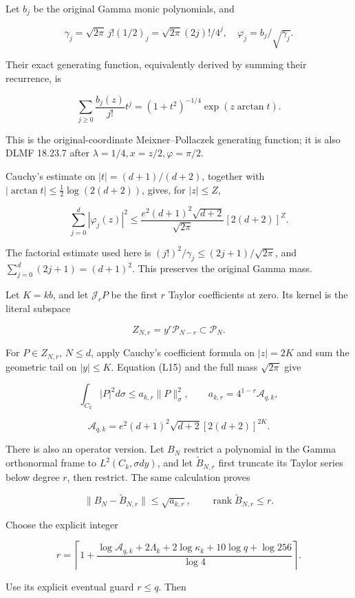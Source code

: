 \documentclass[11pt,a4paper]{article}
\begin{document}
Let \(b_j\) be the original Gamma monic polynomials, and

\[
\gamma_j=\sqrt{2\pi}\,j!(1/2)_j
=\sqrt{2\pi}(2j)!/4^j,\quad \varphi_j=b_j/\sqrt{\gamma_j}.
\]

Their exact generating function, equivalently derived by summing their recurrence, is

\[
\sum_{j\ge0}\frac{b_j(z)}{j!}t^j
=(1+t^2)^{-1/4}\exp(z\arctan t).
\tag{L14}
\]

This is the original-coordinate Meixner--Pollaczek generating function; it is also DLMF 18.23.7 after \(\lambda=1/4,x=z/2,\varphi=\pi/2\).

Cauchy's estimate on \(|t|=(d+1)/(d+2)\), together with
\(|\arctan t|\le\frac12\log(2(d+2))\), gives, for \(|z|\le Z\),

\[
\sum_{j=0}^d|\varphi_j(z)|^2
\le\frac{e^2(d+1)^2\sqrt{d+2}}{\sqrt{2\pi}}
[2(d+2)]^Z.
\tag{L15}
\]

The factorial estimate used here is
\((j!)^2/\gamma_j\le(2j+1)/\sqrt{2\pi}\), and
\(\sum_{j=0}^d(2j+1)=(d+1)^2\). This preserves the original Gamma mass.

Let \(K=kb\), and let \(\mathcal J_rP\) be the first \(r\) Taylor coefficients at zero. Its kernel is the literal subspace

\[
Z_{N,r}=y^r\mathcal P_{N-r}\subset\mathcal P_N.
\tag{L16}
\]

For \(P\in Z_{N,r}\), \(N\le d\), apply Cauchy's coefficient formula on \(|z|=2K\) and sum the geometric tail on \(|y|\le K\). Equation (L15) and the full mass \(\sqrt{2\pi}\) give

\[
\boxed{\int_{C_k}|P|^2d\sigma\le a_{k,r}\|P\|_\sigma^2,\qquad
 a_{k,r}=4^{1-r}\mathcal A_{q,k},}
\tag{L17}
\]

\[
\mathcal A_{q,k}=e^2(d+1)^2\sqrt{d+2}[2(d+2)]^{2K}.
\]

There is also an operator version. Let \(B_N\) restrict a polynomial in the Gamma orthonormal frame to \(L^2(C_k,\sigma dy)\), and let \(\widetilde B_{N,r}\) first truncate its Taylor series below degree \(r\), then restrict. The same calculation proves

\[
\|B_N-\widetilde B_{N,r}\|\le\sqrt{a_{k,r}},\qquad
\operatorname{rank}\widetilde B_{N,r}\le r.
\tag{L18}
\]

Choose the explicit integer

\[
\boxed{r=\left\lceil 1+
\frac{\log\mathcal A_{q,k}+2\Lambda_k+2\log\kappa_k
+10\log q+\log256}{\log4}\right\rceil.}
\tag{L19}
\]

Use its explicit eventual guard \(r\le q\). Then
\end{document}
